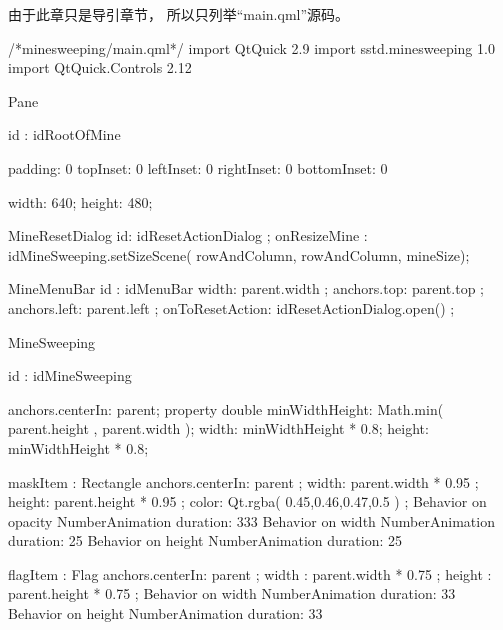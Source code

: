 由于此章只是导引章节，
所以只列举“main.qml”源码。

\label{f000083}    %
\FloatBarrier                                  %
\begin{thebookfilesourceone}[escapeinside={(*@}{@*)},
caption=GoodLuck,
title=\filesourcenumbernameone \thefilesourcenumber
]
/*minesweeping/main.qml*/
import QtQuick 2.9
import sstd.minesweeping 1.0
import QtQuick.Controls 2.12

Pane {

    id : idRootOfMine

    padding: 0
    topInset: 0
    leftInset: 0
    rightInset: 0
    bottomInset: 0

    width: 640;
    height: 480;

    MineResetDialog{
        id: idResetActionDialog ;
        onResizeMine : {
            idMineSweeping.setSizeScene(
                        rowAndColumn,
                        rowAndColumn,
                        mineSize);
        }
    }

    MineMenuBar{
        id : idMenuBar
        width: parent.width ;
        anchors.top: parent.top ;
        anchors.left: parent.left ;
        onToResetAction: {
            idResetActionDialog.open() ;
        }
    }

    MineSweeping{

        id : idMineSweeping

        anchors.centerIn: parent;
        property double minWidthHeight:
            Math.min( parent.height , parent.width );
        width: minWidthHeight * 0.8;
        height: minWidthHeight * 0.8;

        maskItem : Rectangle {
            anchors.centerIn: parent       ;
            width: parent.width * 0.95     ;
            height: parent.height * 0.95   ;
            color: Qt.rgba( 0.45,0.46,0.47,0.5 ) ;
            Behavior on opacity{
                NumberAnimation{
                    duration: 333
                }
            }
            Behavior on width{
                NumberAnimation{
                    duration: 25
                }
            }
            Behavior on height{
                NumberAnimation{
                    duration: 25
                }
            }
        }

        flagItem : Flag{
            anchors.centerIn: parent ;
            width  : parent.width * 0.75 ;
            height : parent.height * 0.75 ;
            Behavior on width{
                NumberAnimation{
                    duration: 33
                }
            }
            Behavior on height{
                NumberAnimation{
                    duration: 33
                }
            }
        }

}}
\end{thebookfilesourceone}

